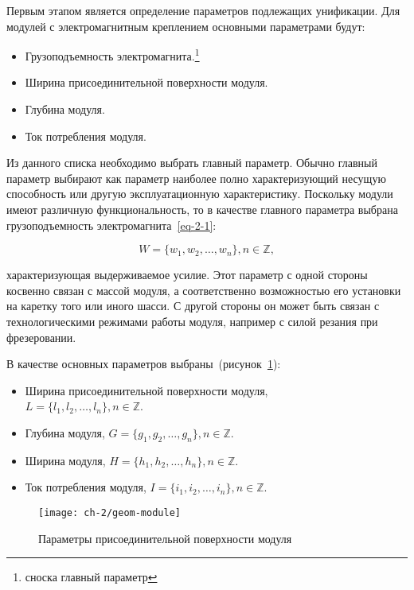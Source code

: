 Первым этапом является определение параметров подлежащих унификации. Для модулей с электромагнитным креплением основными параметрами будут:

\begin{itemize}
	\item Грузоподъемность электромагнита.\footnote{сноска главный параметр}
	\item Ширина присоединительной поверхности модуля. 
	\item Глубина модуля.
	\item Ток потребления модуля.
\end{itemize}


Из данного списка необходимо выбрать главный параметр. Обычно главный параметр выбирают как параметр наиболее полно характеризующий несущую способность или другую эксплуатационную характеристику. Поскольку модули имеют различную функциональность, то в качестве главного параметра выбрана грузоподъемность электромагнита~\cref{eq-2-1}:

\begin{equation}
W = \{w_1, w_2, \ldots, w_n\}, n \in \mathbb{Z},
\label{eq-2-1}
\end{equation}

\noindent характеризующая выдерживаемое усилие. Этот параметр с одной стороны косвенно связан с массой модуля, а соответственно возможностью его установки на каретку того или иного шасси. С другой стороны он может быть связан с технологическими режимами работы модуля, например с силой резания при фрезеровании.

В качестве основных параметров выбраны~(рисунок~\cref{fig:geom-module}):

\begin{itemize}
	\item Ширина присоединительной поверхности модуля,\\$L = \{l_1, l_2, \ldots, l_n\}, n \in \mathbb{Z}$.
	\item Глубина модуля, $G = \{g_1, g_2, \ldots, g_n\}, n \in \mathbb{Z}$.
	\item Ширина модуля, $H = \{h_1, h_2, \ldots, h_n\}, n \in \mathbb{Z}$.
	\item Ток потребления модуля, $I = \{i_1, i_2, \ldots, i_n\}, n \in \mathbb{Z}$.
\end{itemize}

\begin{figure}[tbh]
	\centering
	\texttt{[image: ch-2/geom-module]}
	\caption{Параметры присоединительной поверхности модуля}
	\label{fig:geom-module}
\end{figure}

